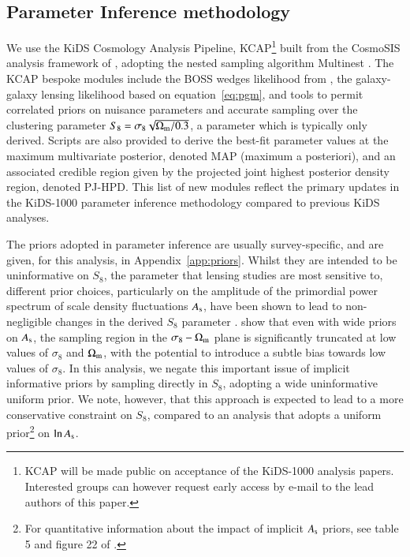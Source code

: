 \subsection{Parameter Inference methodology}
\label{sec:KCAP}
We use the KiDS Cosmology Analysis Pipeline, {\sc KCAP}\footnote{KCAP will be made public on acceptance of the KiDS-1000 analysis papers.   Interested groups can however request early access by e-mail to the lead authors of this paper.} built from the {\sc CosmoSIS} analysis framework of \citet{zuntz/etal:2015}, adopting the nested sampling algorithm {\sc Multinest} \citep{feroz/hobson:2008,feroz/etal:2009,feroz/etal:2019}.  The {\sc KCAP} bespoke modules include the BOSS wedges likelihood from \citet{sanchez/etal:2017}, the galaxy-galaxy lensing likelihood based on equation~\ref{eq:pgm}, and tools to permit correlated priors on nuisance parameters and accurate sampling over the clustering parameter $S_8= \sigma_8 \sqrt{\Omega_{\rm m}/0.3}$, a parameter which is typically only derived.  Scripts are also provided to derive the best-fit parameter values at the maximum multivariate posterior, denoted MAP (maximum a posteriori), and an associated credible region given by the projected joint highest posterior density region, denoted PJ-HPD.  This list of new modules reflect the primary updates in the KiDS-1000 parameter inference methodology compared to previous KiDS analyses.

The priors adopted in parameter inference are usually survey-specific, and are given, for this analysis, in Appendix~\ref{app:priors}.  Whilst they are intended to be uninformative on $S_8$, the parameter that lensing studies are most sensitive to, different prior choices, particularly on the amplitude of the primordial power spectrum of scale density fluctuations $A_{\rm s}$, have been shown to lead to non-negligible changes in the derived $S_8$ parameter \citep{chang/etal:2019, joudaki/etal:2020, asgari/etal:2020_KD}.   \citet{joachimi/etal:inprep} show that even with wide priors on $A_{\rm s}$,  the sampling region in the $\sigma_8 - \Omega_{\rm m}$ plane is significantly truncated at low values of $\sigma_8$ and $\Omega_{\rm m}$, with the potential to introduce a subtle bias towards low values of $\sigma_8$.   In this analysis, we negate this important issue of implicit informative priors by sampling directly in $S_8$, adopting a wide uninformative uniform prior.  We note, however, that this approach is expected to lead to a more conservative constraint on $S_8$, compared to an analysis that adopts a uniform prior\footnote{For quantitative information about the impact of implicit $A_{\rm s}$ priors, see table 5 and figure 22 of \citet{joachimi/etal:inprep}.} on $\ln A_{\rm s}$.

